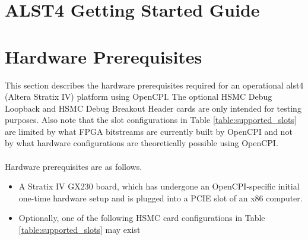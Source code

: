 \documentclass{article}
\begin{document}
\section*{ALST4 Getting Started Guide}
\setcounter{section}{0}
\section{Hardware Prerequisites}
This section describes the hardware prerequisites required for an operational alst4 (Altera Stratix IV) platform using OpenCPI. The optional HSMC Debug Loopback and HSMC Debug Breakout Header cards are only intended for testing purposes. Also note that the slot configurations in Table \ref{table:supported_slots} are limited by what FPGA bitstreams are currently built by OpenCPI and not by what hardware configurations are theoretically possible using OpenCPI.\\ \\
Hardware prerequisites are as follows.
\begin{itemize}
\item A Stratix IV GX230 board, which has undergone an OpenCPI-specific initial one-time hardware setup \cite{alst4_hardware_setup} and is plugged into a PCIE slot of an x86 computer.
\item Optionally, one of the following HSMC card configurations in Table  \ref{table:supported_slots} may exist
\end{itemize}
\end{document}
